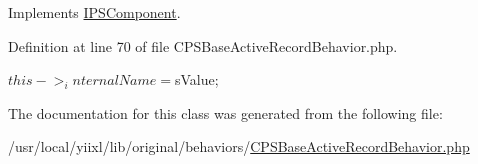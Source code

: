 Implements \hyperlink{interfaceIPSComponent_a08e716b913e06fdbb77e84f81c0a3a35}{IPSComponent}.



Definition at line 70 of file CPSBaseActiveRecordBehavior.php.




\begin{DoxyCode}
{ $this->_internalName = $sValue; }
\end{DoxyCode}




The documentation for this class was generated from the following file:\begin{DoxyCompactItemize}
\item 
/usr/local/yiixl/lib/original/behaviors/\hyperlink{CPSBaseActiveRecordBehavior_8php}{CPSBaseActiveRecordBehavior.php}\end{DoxyCompactItemize}
